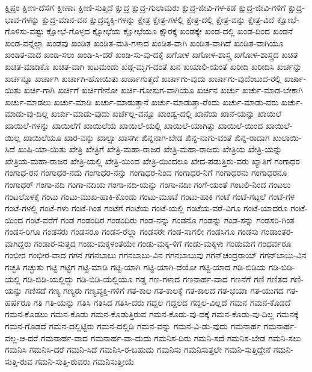 {ಕ್ಷಿಪ್ರಂ
ಕ್ಷೀಣ-ದೆಸೆಗೆ
ಕ್ಷೀಣಾಃ
ಕ್ಷೀಣಿ-ಸುತ್ತಿದೆ
ಕ್ಷುದ್ರ
ಕ್ಷುದ್ರ-ಗುಲಾಮರು
ಕ್ಷುದ್ರ-ಜೀವಿ-ಗಳ-ಕಡೆ
ಕ್ಷುದ್ರ-ಜೀವಿ-ಗಳಿಗೆ
ಕ್ಷುದ್ರ-ಭಾವ-ಗಳನ್ನು
ಕ್ಷುದ್ರ-ಮಾನ-ವನ
ಕ್ಷುದ್ರವ್ಯಕ್ತಿ-ಗಳನ್ನು
ಕ್ಷೇತ್ರ
ಕ್ಷೇತ್ರ-ಗಳಲ್ಲಿ
ಕ್ಷೇತ್ರ-ದಲ್ಲಿ
ಕ್ಷೇತ್ರ-ವನ್ನು
ಕ್ಷೇತ್ರ-ವಿದೆ
ಕ್ಷೋಭೆ-ಗೊಳಿಸು-ವಷ್ಟು
ಕ್ಷೋಭೆ-ಗೊಳ್ಳದ
ಕ್ಷೋಭೆಯ
ಕ್ಷೋಭೆಯೂ
ಕ್ಷೌರಕ್ಕೆ
ಖಂಡಕ್ಕೇ
ಖಂಡ-ದಲ್ಲಿ
ಖಂಡ-ದಿಂದ
ಖಂಡನೆ
ಖಂಡ-ವನ್ನೆಲ್ಲಾ
ಖಂಡವು
ಖಂಡಿತ
ಖಂಡಿತ-ಮತಿ-ಗಳಾದ
ಖಂಡಿತ-ವಾಗಿ
ಖಂಡಿತ-ವಾಗಿದೆ
ಖಂಡಿತ-ವಾಗಿಯೂ
ಖಂಡಿತ-ವಾದ
ಖಂಡಿ-ಸಲು
ಖಂಡಿ-ಸಿ-ದರೆ
ಖಂಡಿ-ಸು-ವು-ದಕ್ಕೆ
ಖಗೋಳ
ಖಗೋಳ-ಶಾಸ್ತ್ರ
ಖಗೋಳ-ಶಾಸ್ತ್ರದ
ಖಚಿತ
ಖಚಿತ-ಮಾಡಿಕೊ
ಖಚಿತ-ವಾಗಿ
ಖಟಮಂಡು
ಖಡ್ಗ-ಮೃಗ-ದಂತೆ
ಖನ
ಖಯಾಲಿ-ಯಂತೆ
ಖರೀದಿ
ಖರೀದಿಸಿ
ಖರ್ಚನ್ನು
ಖರ್ಚನ್ನೂ
ಖರ್ಚಾಗಿ
ಖರ್ಚಾಗಿ-ಹೋಯಿತು
ಖರ್ಚಾಗುತ್ತದೆ
ಖರ್ಚಾಗು-ವುದು
ಖರ್ಚಾಗು-ವುದೆಂಬುದ-ರಲ್ಲಿ
ಖರ್ಚಾ-ಯಿತು
ಖರ್ಚಿ-ಗಾಗಿ
ಖರ್ಚಿಗೆ
ಖರ್ಚಿಗೇನೋ
ಖರ್ಚಿ-ಗೋಸುಗ-ವಾಗಿಯೂ
ಖರ್ಚಿನ
ಖರ್ಚು
ಖರ್ಚು-ಮಾಡ-ಬೇಕಾಗಿ
ಖರ್ಚು-ಮಾಡಲು
ಖರ್ಚು-ಮಾಡಿ
ಖರ್ಚು-ಮಾಡುತ್ತಾನೆ
ಖರ್ಚು-ಮಾಡುತ್ತಾ-ರೆಂದು
ಖರ್ಚು-ಮಾಡು-ವರು
ಖರ್ಚು-ಮಾಡು-ವು-ದಿಲ್ಲ
ಖರ್ಚು-ಮಾಡು-ವುದು
ಖರ್ಚೆಲ್ಲ-ವನ್ನೂ
ಖಾಂಡ್ವ-ದಲ್ಲಿ
ಖಾನೆಯ
ಖಾನೆ-ಯನ್ನು
ಖಾಯಿಲೆ
ಖಾಯಿಲೆ-ಗಳನ್ನು
ಖಾಯಿಲೆಗೆ
ಖಾಯಿಲೆಯ
ಖಾಯಿಲೆ-ಯಲ್ಲಿ
ಖಾಯಿಲೆ-ಯಾಗಿತ್ತು
ಖಾಯಿಲೆ-ಯಿಂದ
ಖಾಯಿಲೆ-ಯಿಲ್ಲ
ಖಾಯಿಲೆಯೂ
ಖಾರ-ವನ್ನು
ಖಾಲ್ಸಾ
ಖಾಸಗೀ
ಖಿನ್ನನಾಗ-ಬೇಡ
ಖಿನ್ನ-ನಾಗು-ವಂತೆ
ಖಿನ್ನ-ರಾದಾಗ
ಖುಲಾಯಿ-ಸಿದೆ
ಖುಷಿ-ಯಾ-ಯಿತು
ಖೇತ್ರಿ
ಖೇತ್ರಿಗೆ
ಖೇತ್ರಿ-ಮಹಾ-ರಾಜರ
ಖೇತ್ರಿ-ಮಹಾ-ರಾಜರು
ಖೇತ್ರಿಯ
ಖೇತ್ರಿ-ಯನ್ನು
ಖೇತ್ರಿಯ-ಮಹಾ-ರಾಜರ
ಖೇತ್ರಿ-ಯಲ್ಲಿ
ಖೇತ್ರಿ-ಯಿಂದ
ಖೇತ್ರಿ-ಯಿಂದಲೂ
ಖೇದ-ಪಡುತ್ತಿರು-ವರು
ಖ್ಯಾತಿಗೆ
ಗಂಗಾಧರ
ಗಂಗಾಧ-ರನ
ಗಂಗಾಧರ-ನದು
ಗಂಗಾಧರ-ನನ್ನು
ಗಂಗಾಧರ-ನಿಂದ
ಗಂಗಾಧರ-ನಿಗೆ
ಗಂಗಾಧರನು
ಗಂಗಾಧರನೂ
ಗಂಗಾಧರ್
ಗಂಗಾ-ನದಿ
ಗಂಗಾ-ನದಿಯ
ಗಂಗಾ-ನದಿ-ಯನ್ನು
ಗಂಗಾ-ನದೀ
ಗಂಗೆ-ಯಂತೆ
ಗಂಟಲಿ-ನಿಂದ
ಗಂಟಲು
ಗಂಟಲೊಳಕ್ಕೆ
ಗಂಟು
ಗಂಟು-ಮುಖ-ಹಾಕಿ-ಕೊಂಡು
ಗಂಟು-ಮೂಟೆ
ಗಂಟು-ಹಾಕಿ
ಗಂಟೆ
ಗಂಟೆ-ಗಟ್ಟಲೆ
ಗಂಟೆ-ಗಳ
ಗಂಟೆ-ಗಳಲ್ಲಿ
ಗಂಟೆ-ಗಳು
ಗಂಟೆ-ಗಿಂತ
ಗಂಟೆಗೆ
ಗಂಟೆಯ
ಗಂಟೆ-ಯಲ್ಲಿ
ಗಂಟೆಯ-ವರೆ-ವಿಗೂ
ಗಂಟೆ-ಯಾದರೂ
ಗಂಟೆ-ಯಿಂದ
ಗಂಟೆ-ವರೆಗೆ
ಗಂಡ
ಗಂಡಂದಿರ
ಗಂಡಂದಿರು
ಗಂಡ-ನನ್ನು
ಗಂಡನೊ
ಗಂಡನ್ನು
ಗಂಡ-ಸನ್ನು
ಗಂಡಸರಿ-ಗಿಂತ
ಗಂಡಸ-ರಿಗೂ
ಗಂಡಸರು
ಗಂಡಸರೂ
ಗಂಡಸ-ರೆಲ್ಲಾ
ಗಂಡಸರೇ
ಗಂಡ-ಸಾಗಲೀ
ಗಂಡಸಿಗೂ
ಗಂಡಸು
ಗಂಡಾಂತರ-ವಾಗಿದ್ದರು
ಗಂಡಾರ-ಸುತ್ತದ
ಗಂಡು-ಮಕ್ಕಳಂತೆಯೇ
ಗಂಡು-ಮಕ್ಕ-ಳಿಗೆ
ಗಂಡು-ಮಕ್ಕಳು
ಗಂಡುಮಗ
ಗಂಧರ್ವರೂ
ಗಂಭೀರ
ಗಂಭೀರ-ವಾದ
ಗಗನ
ಗಗನಬಾಬು
ಗಗನಬಾಬು-ವಿನ
ಗಗನಬಾಬುವು
ಗಗನ್‌ಚಂದ್ರರಾಯ್
ಗಗನ್‌ಬಾಬು-ವಿನ
ಗಚ್ಛತಿ
ಗಚ್ಛುತು
ಗಟ್ಟಿ
ಗಟ್ಟಿಗ
ಗಟ್ಟಿ-ಮಾಡಿ
ಗಟ್ಟಿ-ಯಾಗಿ
ಗಟ್ಟಿ-ಯಾಗಿ-ದೆಯೋ
ಗಟ್ಟಿ-ಯಾದ
ಗಡಿ-ಬಿಡಿಯ
ಗಡಿ-ಬಿಡಿ-ಯಲ್ಲಿ
ಗಡಿ-ಬಿಡಿ-ಯಲ್ಲಿದ್ದು
ಗಡಿ-ಬಿಡಿ-ಯಲ್ಲಿಯೂ
ಗಡ್ಡ
ಗಣ-ಗಳಾದ
ಗಣನಾರ್ಹ-ವಾದ
ಗಣನೆಗೆ
ಗಣಿ
ಗಣಿತದ
ಗಣಿ-ಯನ್ನು
ಗಣಿಸದೆ
ಗಣ್ಯ
ಗಣ್ಯರು
ಗಣ್ಯವ್ಯಕ್ತಿ-ಗಳಿಗೆ
ಗತ-ಕಾಲ
ಗತ-ಕಾಲಕ್ಕೆ
ಗತ-ಕಾಲದ
ಗತ-ಭಯಾ
ಗತ-ಯುಗದ
ಗತ-ಹರ್ಷರೂ
ಗತಿ
ಗತಿ-ಯನ್ನು
ಗತಿಸಿ
ಗತಿಸಿದ
ಗತಿಸಿ-ದರು
ಗದ್ದಲ
ಗದ್ದಲದ
ಗದ್ದಲ-ವಿಲ್ಲದೆ
ಗಮನ
ಗಮನ-ಕೊಡದೆ
ಗಮನ-ಕೊಡಲು
ಗಮನ-ಕೊಡು
ಗಮನ-ಕೊಡುತ್ತಿರುವ
ಗಮನ-ಕೊಡು-ವು-ದಕ್ಕೆ
ಗಮನ-ಕೊಡು-ವು-ದಿಲ್ಲ
ಗಮನಕ್ಕೆ
ಗಮನ-ಗೊಡದೆ
ಗಮನ-ದಲ್ಲಿಟ್ಟಿರು
ಗಮನ-ದಲ್ಲಿಡಿ
ಗಮನ-ವನ್ನು
ಗಮನ-ವಿ-ಡು-ವುದು
ಗಮನಾರ್ಹ
ಗಮನಾರ್ಹ-ವಲ್ಲ-ಆ-ದರೆ
ಗಮನಾರ್ಹ-ವಾದ
ಗಮನಾರ್ಹ-ವಾ-ದುದು
ಗಮನಿಸ-ದಿರು
ಗಮನಿ-ಸದೆ
ಗಮನಿಸ-ಬೇಡ
ಗಮನಿ-ಸಲು
ಗಮನಿಸಿ
ಗಮನಿಸಿ-ದರೆ
ಗಮನಿ-ಸಿದೆ
ಗಮನಿಸಿ-ರ-ಬಹುದು
ಗಮನಿಸು
ಗಮನಿಸುತ್ತಲೇ
ಗಮನಿ-ಸುತ್ತಿದ್ದೇನೆ
ಗಮನಿ-ಸುತ್ತಿ-ರುವ
ಗಮನಿ-ಸುತ್ತಿ-ರುವರು
ಗಮನಿಸುತ್ತೀಯೆ
}
